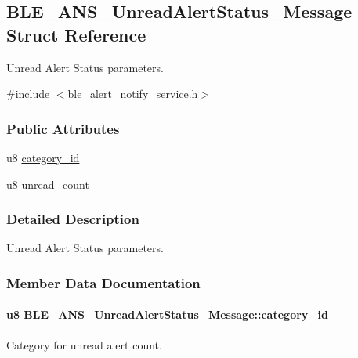 \hypertarget{struct_b_l_e___a_n_s___unread_alert_status___message}{}\subsection{B\+L\+E\+\_\+\+A\+N\+S\+\_\+\+Unread\+Alert\+Status\+\_\+\+Message Struct Reference}
\label{struct_b_l_e___a_n_s___unread_alert_status___message}


Unread Alert Status parameters.  




{\ttfamily \#include $<$ble\+\_\+alert\+\_\+notify\+\_\+service.\+h$>$}

\subsubsection*{Public Attributes}
\begin{DoxyCompactItemize}
\item 
u8 \hyperlink{struct_b_l_e___a_n_s___unread_alert_status___message_ae51a8363568b720117a8b1f8bd2e3569}{category\+\_\+id}
\item 
u8 \hyperlink{struct_b_l_e___a_n_s___unread_alert_status___message_a520189c6388ef43a961e8d52b872843a}{unread\+\_\+count}
\end{DoxyCompactItemize}


\subsubsection{Detailed Description}
Unread Alert Status parameters. 

\subsubsection{Member Data Documentation}
\paragraph[{\texorpdfstring{category\+\_\+id}{category_id}}]{\setlength{\rightskip}{0pt plus 5cm}u8 B\+L\+E\+\_\+\+A\+N\+S\+\_\+\+Unread\+Alert\+Status\+\_\+\+Message\+::category\+\_\+id}\hypertarget{struct_b_l_e___a_n_s___unread_alert_status___message_ae51a8363568b720117a8b1f8bd2e3569}{}\label{struct_b_l_e___a_n_s___unread_alert_status___message_ae51a8363568b720117a8b1f8bd2e3569}
Category for unread alert count. 
